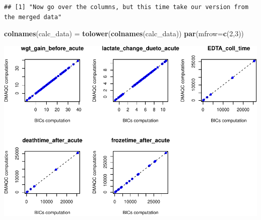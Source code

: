 \documentclass[]{article}
\newenvironment{Shaded}{\begin{snugshade}}{\end{snugshade}}
\newcommand{\KeywordTok}[1]{\textcolor[rgb]{0.13,0.29,0.53}{\textbf{#1}}}
\newcommand{\DataTypeTok}[1]{\textcolor[rgb]{0.13,0.29,0.53}{#1}}
\newcommand{\DecValTok}[1]{\textcolor[rgb]{0.00,0.00,0.81}{#1}}
\newcommand{\StringTok}[1]{\textcolor[rgb]{0.31,0.60,0.02}{#1}}
\newcommand{\NormalTok}[1]{#1}
\begin{document}
\begin{verbatim}
## [1] "Now go over the columns, but this time take our version from the merged data"
\end{verbatim}

\begin{Shaded}
\begin{Highlighting}[]
\KeywordTok{colnames}\NormalTok{(calc_data) =}\StringTok{ }\KeywordTok{tolower}\NormalTok{(}\KeywordTok{colnames}\NormalTok{(calc_data))}
\KeywordTok{par}\NormalTok{(}\DataTypeTok{mfrow=}\KeywordTok{c}\NormalTok{(}\DecValTok{2}\NormalTok{,}\DecValTok{3}\NormalTok{))}
\end{Highlighting}
\end{Shaded}

\begin{center}\includegraphics[width=0.9\linewidth,height=0.9\textheight]{pheno_csv_files_analysis_files/figure-latex/unnamed-chunk-7-1} \end{center}
\end{document}
